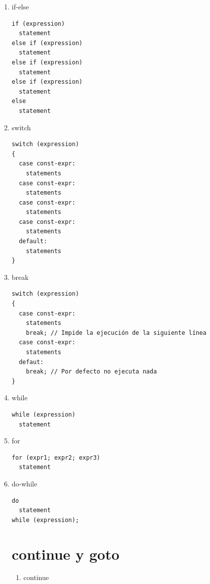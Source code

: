 \documentclass[a4paper,oneside]{article}
\begin{document}
  \begin{enumerate}
  \item if-else

    \begin{verbatim}
if (expression)
  statement
else if (expression)
  statement
else if (expression)
  statement
else if (expression)
  statement
else
  statement
    \end{verbatim}

  \item switch

    \begin{verbatim}
switch (expression)
{
  case const-expr:
    statements
  case const-expr:
    statements
  case const-expr:
    statements
  case const-expr:
    statements
  default:
    statements
}
    \end{verbatim}
 
\pagebreak

  \item break

    \begin{verbatim}
switch (expression)
{
  case const-expr:
    statements
    break; // Impide la ejecución de la siguiente línea
  case const-expr:
    statements
  defaut:
    break; // Por defecto no ejecuta nada
}
    \end{verbatim}

  \item while

    \begin{verbatim}
while (expression)
  statement
    \end{verbatim}

  \item for

    \begin{verbatim}
for (expr1; expr2; expr3)
  statement
    \end{verbatim}

  \item do-while

    \begin{verbatim}
do
  statement
while (expression);
    \end{verbatim}

\section{continue y goto}
  \begin{enumerate}
  \item continue


\end{enumerate}
\end{enumerate}
\end{document}
